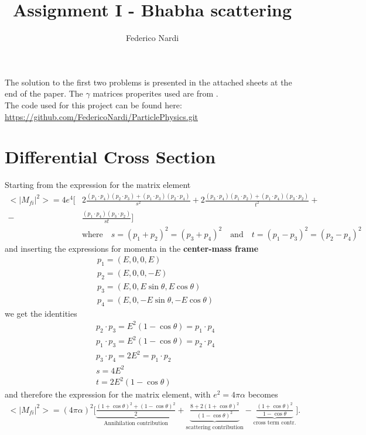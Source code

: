 \documentclass[10pt,a4paper]{article}
\begin{document}
\title{Assignment I - Bhabha scattering}
\author{Federico Nardi}
\maketitle
The solution to the first two problems is presented in the attached sheets at the end of the paper. The $\gamma$ matrices properites used are from \cite{mysaviour}.\\

The code used for this project can be found here:\\
\url{https://github.com/FedericoNardi/ParticlePhysics.git}
\section{Differential Cross Section}
Starting from the expression for the matrix element
\begin{align*}
<|M_{fi}|^2> = 4e^4\bigg[& 2\frac{(p_1 \cdot p_4)(p_2 \cdot p_3)+(p_1 \cdot p_3)(p_2 \cdot p_4)}{s^2}
+
2\frac{(p_3 \cdot p_4)(p_1 \cdot p_2)+(p_1 \cdot p_4)(p_3 \cdot p_2)}{t^2}+\\
-
&\frac{(p_1 \cdot p_4)(p_3 \cdot p_2)}{st}
 \bigg]\\ 
&\text{where}\quad s=(p_1+p_2)^2=(p_3+p_4)^2\quad \text{and}\quad t=(p_1-p_3)^2=(p_2-p_4)^2
\end{align*} 
and inserting the expressions for momenta in the \textbf{center-mass frame}
\begin{align*}
&p_1 = (E,0,0,E)\\
&p_2 = (E,0,0,-E)\\
&p_3 = (E,0,E\sin\theta,E\cos\theta)\\
&p_4 = (E,0,-E\sin\theta,-E\cos\theta)
\end{align*}
we get the identities 
\begin{align*}
&p_2 \cdot p_3 = E^2(1-\cos\theta) = p_1 \cdot p_4\\
&p_1 \cdot p_3 = E^2(1-\cos\theta) = p_2 \cdot p_4\\
&p_3 \cdot p_4 = 2E^2 = p_1 \cdot p_2\\
&s = 4E^2\\
&t = 2E^2(1-\cos\theta)
\end{align*}
and therefore the expression for the matrix element, with $e^2=4\pi\alpha$ becomes
\begin{align*}
<|M_{fi}|^2> = (4\pi\alpha)^2\bigg[ \underbrace{\frac{(1+\cos\theta)^2+(1-\cos\theta)^2}{2}}_{\text{Annihilation contribution}} + \underbrace{\frac{8+2(1+\cos\theta)^2}{(1-\cos\theta)^2}}_{\text{scattering contribution}} - \underbrace{\frac{(1+\cos\theta)^2}{1-\cos\theta}}_{\text{cross term contr.}}\bigg].
\end{align*}
\end{document}
